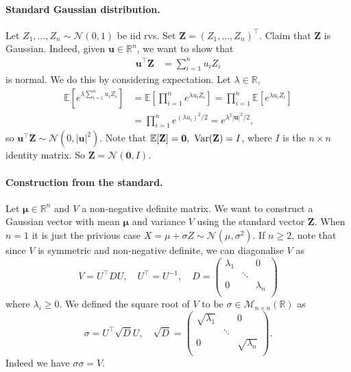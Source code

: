 \paragraph{Standard Gaussian distribution.} Let $ Z_1,\dots,Z_n \sim \mathcal{N}(0,1) $ be iid rvs. Set $ \mathbf{Z} = (Z_1,\dots,Z_n)^\top  $. Claim that $\mathbf{Z}$ is Gaussian. Indeed, given $ \mathbf{u}\in \mathbb{R}^{n} $, we want to show that
\begin{align*}
    \mathbf{u}^\top\mathbf{Z} &= \sum_{i=1}^{n} u_i Z_i
\end{align*}
is normal. We do this by considering expectation. Let $ \lambda\in \mathbb{R} $, 
\begin{align*}
    \mathbb{E}[ e^{\lambda \sum_{i=1}^{n}u_iZ_i}] &= \mathbb{E} \left[ \prod_{i=1}^{n} e^{\lambda u_i Z_i} \right] = \prod_{i=1}^{n}\mathbb{E}[e^{\lambda u_i Z_i}]\\ 
    &= \prod_{i=1}^{n} e^{(\lambda u_i)^2/2} = e^{\lambda^2|\mathbf{u}|^2/2},
\end{align*}
so $ \mathbf{u}^\top \mathbf{Z} \sim \mathcal{N}(0,|\mathbf{u}|^2) $. Note that $ \mathbb{E}[\mathbf{Z}]=\mathbf{0},\ \var(\mathbf{Z})= I $, where $I$ is the $n\times n$ identity matrix. So $ \mathbf{Z} = \mathcal{N}(\mathbf{0}, I) $.

\paragraph{Construction from the standard.} Let $ \boldsymbol{\mu}\in \mathbb{R}^{n} $ and $ V $ a non-negative definite matrix. We want to construct a Gaussian vector with mean $ \boldsymbol{\mu} $ and variance $ V $ using the standard vector $ \mathbf{Z} $. When $n=1$ it is just the privious case $ X=\mu+\sigma Z \sim \mathcal{N}(\mu,\sigma^2) $. If $ n\ge 2 $, note that since $V$ is symmetric and non-negative definite, we can diagonalise $V$ as 
\[
    V = U^\top D U,\quad U^\top =U^{-1},\quad D= \begin{pmatrix}
        \lambda_1 &  & 0 \\
         & \ddots  &  \\
        0 &  & \lambda_n \\
    \end{pmatrix}
\]
where $ \lambda_i\ge 0 $. We defined the square root of $V$ to be $ \sigma\in \mathcal{M}_{n \times n}(\mathbb{R}) $ as 
\[
    \sigma = U^\top \sqrt{D} U,\quad \sqrt{D}= \begin{pmatrix}
        \sqrt{\lambda_1} &  & 0 \\
         & \ddots  &  \\
        0 &  & \sqrt{\lambda_n} \\
    \end{pmatrix}.
\]
Indeed we have $ \sigma \sigma = V $.

